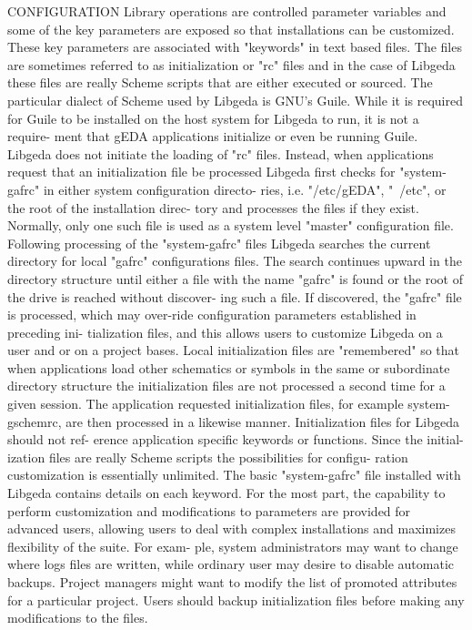 CONFIGURATION
       Library  operations  are controlled parameter variables and some of the
       key parameters are exposed so that  installations  can  be  customized.
       These  key  parameters  are  associated  with  "keywords" in text based
       files. The files are sometimes referred to as  initialization  or  "rc"
       files  and in the case of Libgeda these files are really Scheme scripts
       that are either executed or sourced.  The  particular dialect of Scheme
       used  by  Libgeda  is GNU's Guile. While it is required for Guile to be
       installed on the host system for Libgeda to run, it is not  a  require-
       ment  that  gEDA  applications  initialize  or  even  be running Guile.
       Libgeda does not initiate the loading  of  "rc"  files.  Instead,  when
       applications  request  that an initialization file be processed Libgeda
       first checks for "system-gafrc" in either system configuration directo-
       ries, i.e. "/etc/gEDA", "~/etc", or the root of the installation direc-
       tory and processes the files if they exist.  Normally,  only  one  such
       file  is  used as a system level "master" configuration file. Following
       processing of the "system-gafrc" files  Libgeda  searches  the  current
       directory  for local "gafrc" configurations files. The search continues
       upward in the directory structure until either a  file  with  the  name
       "gafrc"  is found or the root of the drive is reached without discover-
       ing such a file. If discovered, the "gafrc" file  is  processed,  which
       may  over-ride  configuration  parameters established in preceding ini-
       tialization files, and this allows users to customize Libgeda on a user
       and  or on a project bases. Local initialization files are "remembered"
       so that when applications load other schematics or symbols in the  same
       or  subordinate  directory  structure  the initialization files are not
       processed a second time for a given session. The application  requested
       initialization  files,  for example system-gschemrc, are then processed
       in a likewise manner.  Initialization files for Libgeda should not ref-
       erence  application  specific keywords or functions. Since the initial-
       ization files are really Scheme scripts the possibilities for  configu-
       ration customization is essentially unlimited. The basic "system-gafrc"
       file installed with Libgeda contains details on each keyword.  For  the
       most part, the capability to perform customization and modifications to
       parameters are provided for advanced users, allowing users to deal with
       complex installations and maximizes flexibility of the suite. For exam-
       ple, system administrators may want to  change  where  logs  files  are
       written,  while  ordinary user may desire to disable automatic backups.
       Project managers might want to modify the list of  promoted  attributes
       for  a  particular  project.  Users  should backup initialization files
       before making any modifications to the files.


